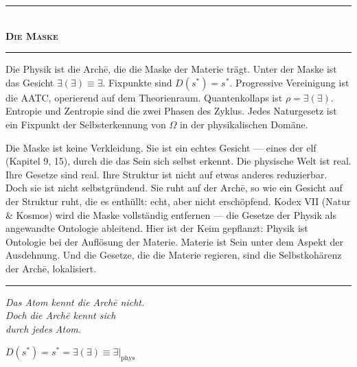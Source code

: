 \documentclass[10pt, openany, oneside]{book}
\renewcommand{\normalsize}{\fontsize{10}{13}\selectfont}
\begin{document}
\begin{center}
    \rule{0.3\textwidth}{0.4pt}\\[0.5em]
    {\normalsize\bfseries\scshape Die Maske}\\[0.3em]
    \rule{0.3\textwidth}{0.4pt}
\end{center}

\vspace{1em}

\noindent Die Physik ist die Arch\={e}, die die Maske der Materie trägt. Unter der Maske ist das Gesicht $\exists(\exists) \equiv \exists$. Fixpunkte sind $D(s^*) = s^*$. Progressive Vereinigung ist die AATC, operierend auf dem Theorienraum. Quantenkollaps ist $\rho = \exists(\exists)$. Entropie und Zentropie sind die zwei Phasen des Zyklus. Jedes Naturgesetz ist ein Fixpunkt der Selbsterkennung von $\Omega$ in der physikalischen Domäne.

Die Maske ist keine Verkleidung. Sie ist ein echtes Gesicht --- eines der elf (Kapitel 9, 15), durch die das Sein sich selbst erkennt. Die physische Welt ist real. Ihre Gesetze sind real. Ihre Struktur ist nicht auf etwas anderes reduzierbar. Doch sie ist nicht selbstgründend. Sie ruht auf der Arch\={e}, so wie ein Gesicht auf der Struktur ruht, die es enthüllt: echt, aber nicht erschöpfend. Kodex VII (Natur \& Kosmos) wird die Maske vollständig entfernen --- die Gesetze der Physik als angewandte Ontologie ableitend. Hier ist der Keim gepflanzt: Physik ist Ontologie bei der Auflösung der Materie. Materie ist Sein unter dem Aspekt der Ausdehnung. Und die Gesetze, die die Materie regieren, sind die Selbstkohärenz der Arch\={e}, lokalisiert.

\vspace{2em}

\begin{center}
    \rule{0.15\textwidth}{0.3pt}
\end{center}

\vspace{0.5em}

\begin{center}
    \itshape
    Das Atom kennt die Arch\={e} nicht.\\
    Doch die Arch\={e} kennt sich\\
    durch jedes Atom.
\end{center}

\vspace{0.5em}

\begin{center}
    $D(s^*) = s^* = \exists(\exists) \equiv \exists|_{\text{phys}}$
\end{center}
\end{document}
